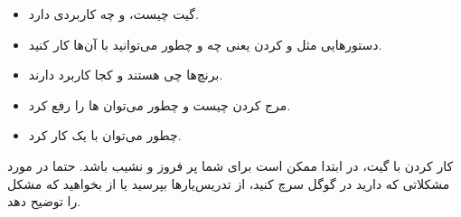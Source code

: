 \begin{itemize}
\tightlist
\item
  گیت چیست، و  چه کاربردی دارد.
\item
  دستورهایی مثل  و  کردن یعنی چه و چطور می‌توانید با
  آن‌ها کار کنید.
\item
  برنچ‌ها چی هستند و کجا کاربرد دارند.
\item
  مرج کردن چیست و چطور می‌توان  ها را رفع کرد.
\item
  چطور می‌توان با یک  کار کرد.
\end{itemize}

کار کردن با گیت، در ابتدا ممکن است برای شما پر فروز و نشیب باشد. حتما در
مورد مشکلاتی که دارید در گوگل سرچ کنید، از تدریس‌یارها بپرسید یا از
 بخواهید که مشکل را توضیح دهد.
	
	
	
	
